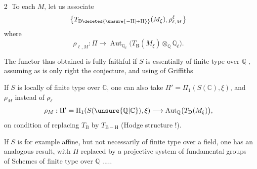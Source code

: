 \textcircled{2}   To each $M$, let us associate
\[
\bigl\{T_{\mathrm B\deleted{\unsure{-\mathrm H|+\mathrm H}}}(M_\xi),\rho_{\ell,M}^{\ell}\bigr\}
\]
  where
\[
\rho_{\ell,M}:\Pi\longrightarrow\operatorname{Aut}_{\mathbb Q_\ell}\bigl(T_{\mathrm B}(M_\xi)\otimes_{\mathbb Q}\mathbb Q_\ell\bigr).
\]

The functor thus obtained is fully faithful if $S$ is essentially of finite type over $\mathbb Q$ , assuming as is only right the  conjecture, and using  of Griffiths

If $S$ is locally of finite type over $\mathbb C$, one can also take $\Pi'=\Pi_1(S(\mathbb C),\xi)$, and $\rho_M$ instead of $\rho_\ell$
\[
\rho_M:\Pi'=\Pi_1(S(\unsure{\mathbb Q|\mathbb C}),\xi)\longrightarrow\operatorname{Aut}_{\mathbb Q}\bigl(T_{\mathrm D}(M_\xi)\bigr),
\]
on condition of replacing $T_{\mathrm B}$ by $T_{\mathrm{B-H}}$ (Hodge structure !).

If $S$ is for example affine,  but not necessarily of finite type over a field, one has an analogous result, with $\Pi$ replaced by a projective system of fundamental groups of Schemes of finite type over $\mathbb Q$ .....

